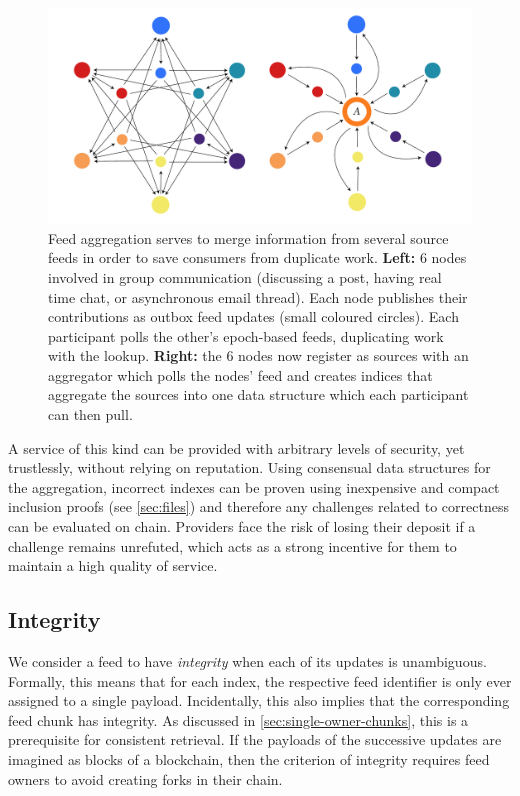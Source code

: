 \begin{figure}[htbp]
\centering
\includegraphics[width=\textwidth]{fig/feed-aggregation-2.pdf}
\caption[Feed aggregation \statusyellow]{Feed aggregation serves to merge information from several source feeds in order to save consumers from duplicate work. \textbf{Left:} 6 nodes involved in group communication (discussing a post, having real time chat, or asynchronous email thread). Each node publishes their contributions as outbox feed updates (small coloured circles). Each participant polls the other's epoch-based feeds, duplicating work with the lookup. \textbf{Right:} the 6 nodes now register  as sources  with an aggregator which polls the nodes' feed and creates indices that aggregate the sources into one data structure which each participant can then pull.}
\label{fig:feed-aggregation}
\end{figure}

A service of this kind can be provided with arbitrary levels of security, yet trustlessly, without relying on reputation. Using consensual data structures for the aggregation, incorrect indexes can be proven using inexpensive and compact inclusion proofs (see \ref{sec:files}) and therefore any challenges related to correctness can be evaluated on chain. Providers face the risk of losing their deposit if a challenge remains unrefuted, which acts as a strong incentive for them to maintain a high quality of service.

\subsection{Integrity \statusyellow}\label{sec:feed-integrity}

We consider a feed to have \emph{integrity} when each of its updates is unambiguous. Formally, this means that for each index, the respective feed identifier is only ever assigned to a single payload. Incidentally, this also implies that the corresponding feed chunk has integrity. As discussed in \ref{sec:single-owner-chunks}, this is a prerequisite for consistent retrieval. 
If the payloads of the successive updates are imagined as blocks of a blockchain, then the criterion of integrity requires feed owners to avoid creating forks in their chain. 

